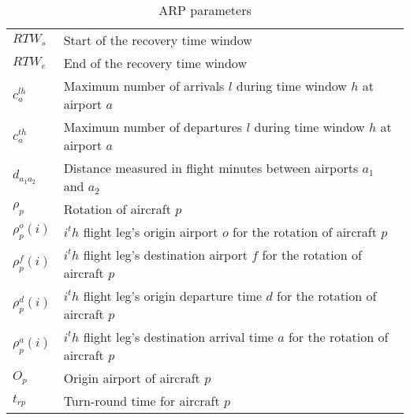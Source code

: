 \begin{table}[h!]
	\centering
	\caption{ARP parameters}
	\label{tbl:parameters}
		\begin{tabular}{ll}
		\hline
		$RTW_s$   & Start of the recovery time window   \\ 
		$RTW_e$   & End of the recovery time window     \\ 
		$c^{lh}_a$ & Maximum number of arrivals $l$ during time window $h$ at airport $a$ \\
		$c^{th}_a$ & Maximum number of departures $l$ during time window $h$ at airport $a$ \\
		$d_{a_{1} a_{2}}$ & Distance measured  in flight minutes between airports $a_{1}$ and $a_{2}$ \\
		$\rho_p $ & Rotation of aircraft $p$ \\
		$\rho^o_p(i)$ & $i^th$  flight leg's origin airport $o$ for the rotation of aircraft $p$ \\
		$\rho^f_p(i)$ & $i^th$  flight leg's destination airport $f$ for the rotation of aircraft $p$ \\
		$\rho^d_p(i)$ & $i^th$  flight leg's origin departure time $d$ for the rotation of aircraft $p$ \\
		$\rho^a_p(i)$ & $i^th$  flight leg's destination arrival time $a$ for the rotation of aircraft $p$ \\
		$O_p$ & Origin airport of aircraft $p$ \\
		$t_{rp}$ & Turn-round time for aircraft $p$ \\
		\hline		
	\end{tabular}
\end{table}


